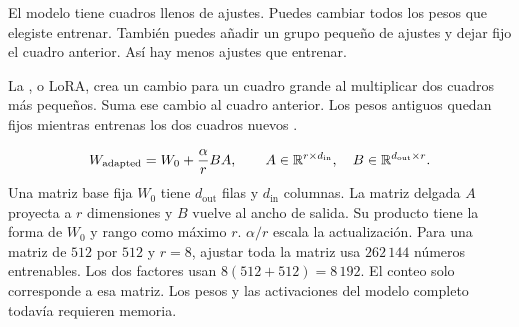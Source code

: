 {El modelo tiene cuadros llenos de ajustes. Puedes cambiar todos los pesos que elegiste entrenar. También puedes añadir un grupo pequeño de ajustes y dejar fijo el cuadro anterior. Así hay menos ajustes que entrenar.

\moremath
La , o LoRA, crea un cambio para un cuadro grande al multiplicar dos cuadros más pequeños. Suma ese cambio al cuadro anterior. Los pesos antiguos quedan fijos mientras entrenas los dos cuadros nuevos \citep{lora}.}
\begin{equation}
 W_{\mathrm{adapted}}=W_0+\frac{\alpha}{r}BA,\qquad
 A\in\mathbb R^{r\times d_{\mathrm{in}}},\quad B\in\mathbb R^{d_{\mathrm{out}}\times r}.
 \label{eq:lora}
\end{equation}
{Una matriz base fija \(W_0\) tiene \(d_{\mathrm{out}}\) filas y \(d_{\mathrm{in}}\) columnas. La matriz delgada \(A\) proyecta a \(r\) dimensiones y \(B\) vuelve al ancho de salida. Su producto tiene la forma de \(W_0\) y rango como máximo \(r\). \(\alpha/r\) escala la actualización. Para una matriz de \(512\) por \(512\) y \(r=8\), ajustar toda la matriz usa \(262\,144\) números entrenables. Los dos factores usan \(8(512+512)=8\,192\). El conteo solo corresponde a esa matriz. Los pesos y las activaciones del modelo completo todavía requieren memoria.}

\section{}

